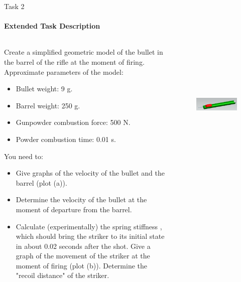 \documentclass[aspectratio=169]{beamer}
\begin{document}
\begin{frame}[t]{Task 2}
    \framesubtitle{Extended Task Description}
    \vspace{-0.6cm}
    \begin{columns}[T,onlytextwidth]
        \begin{column}{0.59\textwidth}
            \scriptsize
            Create a simplified geometric model of the bullet in the barrel of the rifle at the moment of firing. Approximate parameters of the model:
            \begin{itemize}
                \item Bullet weight: 9 g.
                \item Barrel weight: 250 g.
                \item Gunpowder combustion force: 500 N.
                \item Powder combustion time: 0.01 s.
            \end{itemize}
            You need to:
            \vspace{-0.1cm}
            \begin{itemize}
                \item Give graphs of the velocity of the bullet and the barrel (plot (a)).
                \item Determine the velocity of the bullet at the moment of departure from the barrel.
                \item Calculate (experimentally) the spring stiffness , which should bring the striker to its initial state in about 0.02 seconds after the shot. Give a graph of the movement of the striker at the moment of firing (plot (b)). Determine the "recoil distance" of the striker.
            \end{itemize}
        \end{column}
        \begin{column}{0.39\textwidth}
            \vspace{1cm}
            \begin{figure}[H]
                \centering\includegraphics[height=6cm,width=1\textwidth,keepaspectratio]{resources/var1_0.jpeg}
                \label{fig:var1_0.jpeg}
            \end{figure}
        \end{column}
    \end{columns}
\end{frame}
\end{document}
